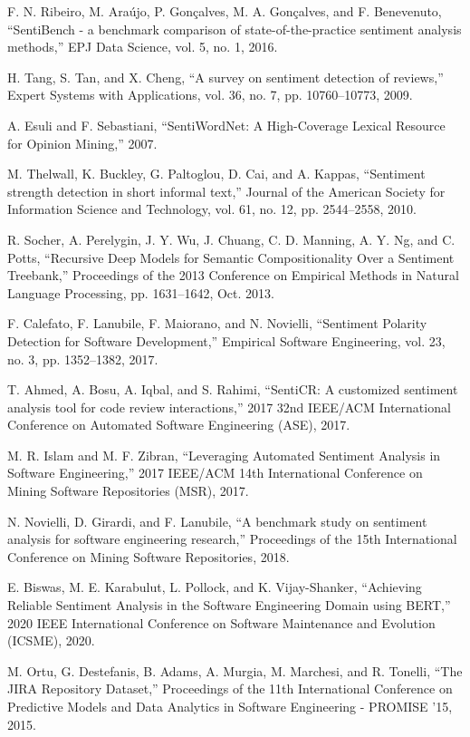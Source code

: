 \documentclass[conference]{IEEEtran}
\begin{document}
\begin{thebibliography}{00}
 F. N. Ribeiro, M. Araújo, P. Gonçalves, M. A. Gonçalves, and F. Benevenuto, “SentiBench - a benchmark comparison of state-of-the-practice sentiment analysis methods,” EPJ Data Science, vol. 5, no. 1, 2016. 

 H. Tang, S. Tan, and X. Cheng, “A survey on sentiment detection of reviews,” Expert Systems with Applications, vol. 36, no. 7, pp. 10760–10773, 2009. 

 A. Esuli and F. Sebastiani, “SentiWordNet: A High-Coverage Lexical Resource for Opinion Mining,” 2007. 

 M. Thelwall, K. Buckley, G. Paltoglou, D. Cai, and A. Kappas, “Sentiment strength detection in short informal text,” Journal of the American Society for Information Science and Technology, vol. 61, no. 12, pp. 2544–2558, 2010. 

 R. Socher, A. Perelygin, J. Y. Wu, J. Chuang, C. D. Manning, A. Y. Ng, and C. Potts, “Recursive Deep Models for Semantic Compositionality Over a Sentiment Treebank,” Proceedings of the 2013 Conference on Empirical Methods in Natural Language Processing, pp. 1631–1642, Oct. 2013. 

 F. Calefato, F. Lanubile, F. Maiorano, and N. Novielli, “Sentiment Polarity Detection for Software Development,” Empirical Software Engineering, vol. 23, no. 3, pp. 1352–1382, 2017. 

 T. Ahmed, A. Bosu, A. Iqbal, and S. Rahimi, “SentiCR: A customized sentiment analysis tool for code review interactions,” 2017 32nd IEEE/ACM International Conference on Automated Software Engineering (ASE), 2017. 

 M. R. Islam and M. F. Zibran, “Leveraging Automated Sentiment Analysis in Software Engineering,” 2017 IEEE/ACM 14th International Conference on Mining Software Repositories (MSR), 2017.

 N. Novielli, D. Girardi, and F. Lanubile, “A benchmark study on sentiment analysis for software engineering research,” Proceedings of the 15th International Conference on Mining Software Repositories, 2018. 

 E. Biswas, M. E. Karabulut, L. Pollock, and K. Vijay-Shanker, “Achieving Reliable Sentiment Analysis in the Software Engineering Domain using BERT,” 2020 IEEE International Conference on Software Maintenance and Evolution (ICSME), 2020.

 M. Ortu, G. Destefanis, B. Adams, A. Murgia, M. Marchesi, and R. Tonelli, “The JIRA Repository Dataset,” Proceedings of the 11th International Conference on Predictive Models and Data Analytics in Software Engineering - PROMISE '15, 2015.


\end{thebibliography}
\end{document}
